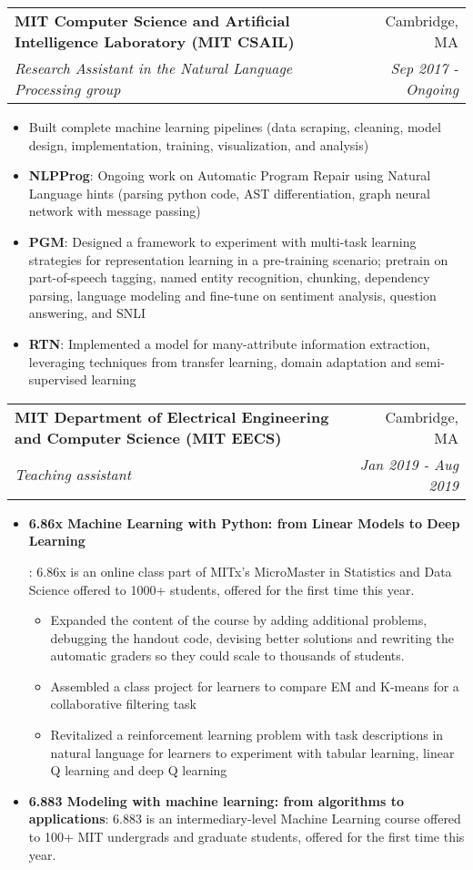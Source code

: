 \documentclass[letterpaper,10pt]{article}
\makeatletter
\newcommand{\resumeItem}[2]{
  \item\small{
    \textbf{#1}{: #2 \vspace{-2pt}}
  }
}
\newcommand{\resumeSubheading}[4]{
  \vspace{-1pt}\item[]
  \begin{tabular*}{0.98\textwidth}{l@{\extracolsep{\fill}}r}
      \hspace{-10pt}\textbf{#1} & #2 \\
      \hspace{-10pt}\textit{\small#3} & \textit{\small #4} \\
    \end{tabular*}\vspace{-5pt}
}
\newcommand{\resumeSubItem}[2]{\resumeItem{#1}{#2}\vspace{-4pt}}
\newcommand{\resumeItemListStart}{\begin{itemize}}
\newcommand{\resumeItemListEnd}{\end{itemize}\vspace{-5pt}}
\makeatother
\begin{document}
    \resumeSubheading
      {MIT Computer Science and Artificial Intelligence Laboratory (MIT CSAIL)}{Cambridge, MA}
      {Research Assistant in the Natural Language Processing group}{Sep 2017 - Ongoing}
      \resumeItemListStart
    \item \small Built complete machine learning pipelines (data scraping, cleaning, model design, implementation, training, visualization, and analysis)
      \resumeSubItem{NLPProg} {Ongoing work on  Automatic Program Repair using Natural Language hints (parsing python code, AST differentiation, graph neural network with message passing)}
      \vspace{3pt}
      \resumeSubItem{PGM} {Designed a framework to experiment with multi-task learning strategies for representation learning in a pre-training scenario; pretrain on part-of-speech tagging, named entity recognition, chunking, dependency parsing, language modeling and fine-tune on sentiment analysis, question answering, and SNLI}
      \vspace{3pt}
        \resumeSubItem{RTN} {Implemented a model for many-attribute information extraction, leveraging techniques from transfer learning, domain adaptation and semi-supervised learning}
      \vspace{3pt}
      \resumeItemListEnd

    \resumeSubheading
      {MIT Department of Electrical Engineering and Computer Science (MIT EECS)}{Cambridge, MA}
      {Teaching assistant}{Jan 2019 - Aug 2019}
      \resumeItemListStart
        \resumeItem{6.86x Machine Learning with Python: from Linear Models to Deep Learning}
        {6.86x is an online class part of MITx's MicroMaster in Statistics and Data Science offered to 1000+ students, offered for the first time this year.
        \vspace{-5pt}
          \begin{itemize}
            \item Expanded the content of the course by adding additional problems, debugging the handout code, devising better solutions and rewriting the automatic graders so they could scale to thousands of students.
            \item Assembled a class project for learners to compare EM and K-means for a collaborative filtering task
            \item Revitalized a reinforcement learning problem with task descriptions in natural language for learners to experiment with tabular learning, linear Q learning and deep Q learning
          \end{itemize}
        }
        \resumeItem{6.883 Modeling with machine learning: from algorithms to applications}
        {
          6.883 is an intermediary-level Machine Learning course offered to 100+  MIT undergrads and graduate students, offered for the first time this year.
        }
      \resumeItemListEnd
\end{document}
